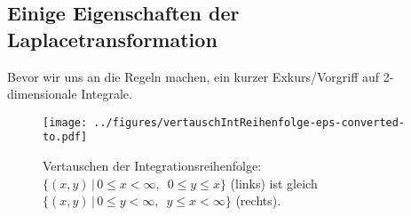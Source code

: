 


\subsection{Einige Eigenschaften der Laplacetransformation}
Bevor wir uns an die Regeln machen, ein kurzer Exkurs/Vorgriff auf 2-dimensionale 
Integrale.



\begin{figure}[htb]
\begin{center}
\texttt{[image: ../figures/vertauschIntReihenfolge-eps-converted-to.pdf]}
\end{center}
\caption{Vertauschen der Integrationsreihenfolge: 
$\{(x,y)\, |\, 0\leq x <\infty,\,\,\, 0\leq y\leq x\}$ (links) ist gleich
$\{(x,y)\, |\, 0\leq y <\infty,\,\,\, y\leq x < \infty\}$ (rechts).}
\label{vertauschFig}
\end{figure}


